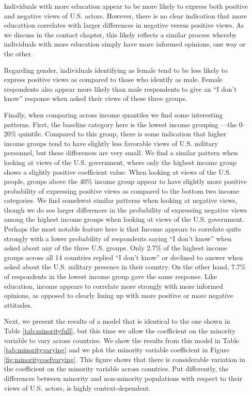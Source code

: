 Individuals with more education appear to be more likely to express both positive and negative views of U.S. actors. However, there is no clear indication that more educattion correlates with larger differences in negative versus positive views. As we discuss in the contact chapter, this likely reflects a similar process whereby individuals with more education simply have more informed opinions, one way or the other. 

\vspace*{-4cm}

Regarding gender, individuals identifying as female tend to be less likely to express positive views as compared to those who identify as male. Female respondents also appear more likely than male respondents to give an ``I don't know'' response when asked their views of these three groups.

Finally, when comparing across income quantiles we find some interesting patterns. First, the baseline category here is the lowest income grouping ---the 0--20\% quintile. Compared to this group, there is some indication that higher income groups tend to have slightly less favorable views of U.S. military personnel, but these differences are very small. We find a similar pattern when looking at views of the U.S. government, where only the highest income group shows a slightly positive coefficient value. When looking at views of the U.S. people, groups above the 40\% income group appear to have slightly more positive probability of expressing positive views as compared to the bottom two income categories. We find somehwat similar patterns when looking at negative views, though we do see larger differences in the probability of expressing negative views among the highest income groups when looking at views of the U.S. government. Perhaps the most notable feature here is that Income appears to correlate quite strongly with a lower probability of respondents saying ``I don't know'' when asked about any of the three U.S. groups. Only 2.7\% of the highest income groups across all 14 countries replied ``I don't know'' or declined to answer when asked about the U.S. military presence in their country. On the other hand, 7.7\% of respondents in the lowest income group gave the same response. Like education, income appears to correlate more strongly with more informed opinions, as opposed to clearly lining up with more positive or more negative attitudes. 

Next, we present the results of a model that is identical to the one shown in Table \ref{tab:minorityfull}, but this time we allow the coefficient on the minority variable to vary across countries. We show the results from this model in Table \ref{tab:minorityvarying} and we plot the minority variable coefficient in Figure \ref{fig:minoritycoefvarying}. This figure shows that there is considerable variation in the coefficient on the minority variable across countries. Put differently, the differences between minority and non-minority populations with respect to their views of U.S. actors, is highly context-dependent. 

